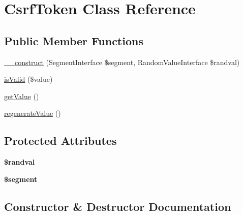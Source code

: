 \hypertarget{class_aura_1_1_session_1_1_csrf_token}{}\section{Csrf\+Token Class Reference}
\label{class_aura_1_1_session_1_1_csrf_token}
\subsection*{Public Member Functions}
\begin{DoxyCompactItemize}
\item 
\mbox{\hyperlink{class_aura_1_1_session_1_1_csrf_token_a347e34d1cb670c60f952f61e00b1ab3e}{\+\_\+\+\_\+construct}} (Segment\+Interface \$segment, Random\+Value\+Interface \$randval)
\item 
\mbox{\hyperlink{class_aura_1_1_session_1_1_csrf_token_a72063d2e922edda5321b1970297eb0c3}{is\+Valid}} (\$value)
\item 
\mbox{\hyperlink{class_aura_1_1_session_1_1_csrf_token_ac0bc18784b182c89fcfd276625aef435}{get\+Value}} ()
\item 
\mbox{\hyperlink{class_aura_1_1_session_1_1_csrf_token_ab839d177349b3374a9348ad77f884f88}{regenerate\+Value}} ()
\end{DoxyCompactItemize}
\subsection*{Protected Attributes}
\begin{DoxyCompactItemize}
\item 
\mbox{\label{class_aura_1_1_session_1_1_csrf_token_a8894e3a0375b8470fd717113bea66940}} 
{\bfseries \$randval}
\item 
\mbox{\label{class_aura_1_1_session_1_1_csrf_token_a21bd0912596fa7de51f44e8bdaf74e83}} 
{\bfseries \$segment}
\end{DoxyCompactItemize}


\subsection{Constructor \& Destructor Documentation}
\mbox{\label{class_aura_1_1_session_1_1_csrf_token_a347e34d1cb670c60f952f61e00b1ab3e}} 
